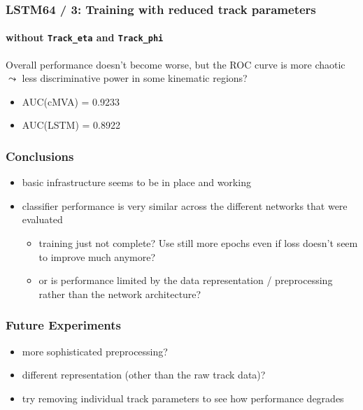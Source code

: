 \documentclass{beamer}
\begin{document}
\begin{frame}
  \frametitle{LSTM64 / 3: Training with reduced track parameters}
  \framesubtitle{without \texttt{Track\_eta} and \texttt{Track\_phi}}
  
  \begin{figure}
    \centering
  \end{figure}

  Overall performance doesn't become worse, but the ROC curve is more chaotic $\leadsto$ less discriminative power in some kinematic regions?
  \begin{itemize}
  \item AUC(cMVA) = 0.9233
  \item AUC(LSTM) = 0.8922
  \end{itemize}
  
\end{frame}

\begin{frame}
  \frametitle{Conclusions}
  \begin{itemize}
  \item basic infrastructure seems to be in place and working
  \item classifier performance is very similar across the different networks that were evaluated
    \begin{itemize}
      \item training just not complete? Use still more epochs even if loss doesn't seem to improve much anymore?
      \item or is performance limited by the data representation / preprocessing rather than the network architecture?
    \end{itemize}
  \end{itemize}
\end{frame}

\begin{frame}
  \frametitle{Future Experiments}

  \begin{itemize}
  \item more sophisticated preprocessing?
  \item different representation (other than the raw track data)?
  \item try removing individual track parameters to see how performance degrades
  \end{itemize}
  
\end{frame}
\end{document}

